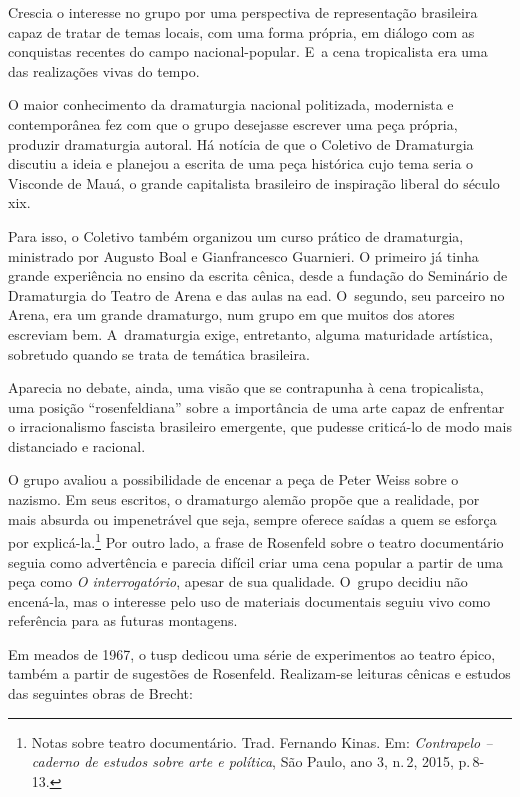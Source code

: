 Crescia o interesse no grupo por uma perspectiva de representação
brasileira capaz de tratar de temas locais, com uma forma própria, em
diálogo com as conquistas recentes do campo nacional-popular. E~a cena
tropicalista era uma das realizações vivas do tempo.

O maior conhecimento da dramaturgia nacional politizada, modernista e
contemporânea fez com que o grupo desejasse escrever uma peça própria,
produzir dramaturgia autoral. Há notícia de que o Coletivo de
Dramaturgia discutiu a ideia e planejou a escrita de uma peça histórica
cujo tema seria o Visconde de Mauá, o grande capitalista brasileiro
de inspiração liberal do século {\sc xix}.

Para isso, o Coletivo também organizou um curso prático
de dramaturgia, ministrado por Augusto Boal e Gianfrancesco Guarnieri. O
primeiro já tinha grande experiência no ensino da escrita cênica, desde
a fundação do Seminário de Dramaturgia do Teatro de Arena e das aulas na
{\sc ead}. O~segundo, seu parceiro no Arena, era um grande dramaturgo, num
grupo em que muitos dos atores escreviam bem. A~dramaturgia exige,
entretanto, alguma maturidade artística, sobretudo quando se trata de
temática brasileira.

Aparecia no debate, ainda, uma visão que se contrapunha à cena
tropicalista, uma posição “rosenfeldiana” sobre a importância de uma
arte capaz de enfrentar o irracionalismo fascista brasileiro emergente,
que pudesse criticá-lo de modo mais distanciado e racional.

O grupo avaliou a possibilidade de encenar a peça de Peter Weiss sobre o nazismo. Em seus escritos, o dramaturgo alemão propõe que a realidade, por
mais absurda ou impenetrável que seja, sempre oferece saídas a quem se
esforça por explicá-la.\footnote{Notas sobre teatro documentário.
  Trad. Fernando Kinas. Em: {\it Contrapelo -- caderno de estudos sobre arte e
    política}, São Paulo, ano 3, n.\,2, 2015, p.\,8-13.} Por outro lado, a
frase de Rosenfeld sobre o teatro documentário seguia como advertência e
parecia difícil criar uma cena popular a partir de uma peça como {\it O
interrogatório}, apesar de sua qualidade. O~grupo decidiu não
encená-la, mas o interesse pelo uso de materiais documentais seguiu vivo
como referência para as futuras montagens.

Em meados de 1967, o {\sc tusp} dedicou uma série de experimentos ao teatro
épico, também a partir de sugestões de Rosenfeld. Realizam-se
leituras cênicas e estudos das seguintes obras de Brecht:

